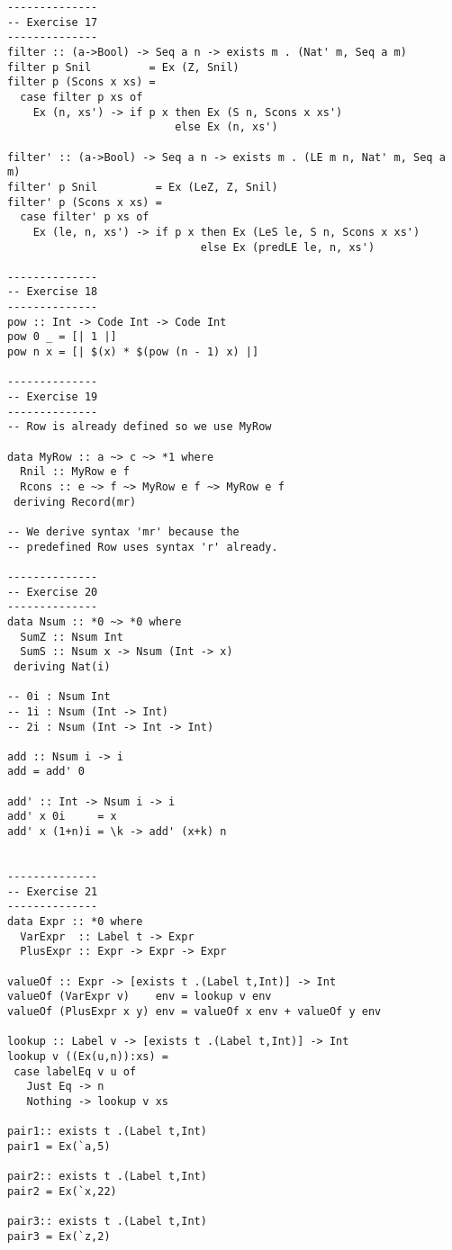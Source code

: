 \documentclass[11pt,twoside,A4]{llncs}
\begin{document}
{\small 
\begin{verbatim}
--------------
-- Exercise 17
--------------
filter :: (a->Bool) -> Seq a n -> exists m . (Nat' m, Seq a m)
filter p Snil         = Ex (Z, Snil)
filter p (Scons x xs) =
  case filter p xs of
    Ex (n, xs') -> if p x then Ex (S n, Scons x xs')
                          else Ex (n, xs')

filter' :: (a->Bool) -> Seq a n -> exists m . (LE m n, Nat' m, Seq a m)
filter' p Snil         = Ex (LeZ, Z, Snil)
filter' p (Scons x xs) =
  case filter' p xs of
    Ex (le, n, xs') -> if p x then Ex (LeS le, S n, Scons x xs')
                              else Ex (predLE le, n, xs')

--------------
-- Exercise 18
--------------
pow :: Int -> Code Int -> Code Int
pow 0 _ = [| 1 |]
pow n x = [| $(x) * $(pow (n - 1) x) |]

--------------
-- Exercise 19
--------------
-- Row is already defined so we use MyRow

data MyRow :: a ~> c ~> *1 where
  Rnil :: MyRow e f
  Rcons :: e ~> f ~> MyRow e f ~> MyRow e f
 deriving Record(mr)

-- We derive syntax 'mr' because the
-- predefined Row uses syntax 'r' already.

--------------
-- Exercise 20
--------------
data Nsum :: *0 ~> *0 where
  SumZ :: Nsum Int
  SumS :: Nsum x -> Nsum (Int -> x)
 deriving Nat(i)

-- 0i : Nsum Int
-- 1i : Nsum (Int -> Int)
-- 2i : Nsum (Int -> Int -> Int)

add :: Nsum i -> i
add = add' 0

add' :: Int -> Nsum i -> i
add' x 0i     = x
add' x (1+n)i = \k -> add' (x+k) n


--------------
-- Exercise 21
--------------
data Expr :: *0 where
  VarExpr  :: Label t -> Expr
  PlusExpr :: Expr -> Expr -> Expr

valueOf :: Expr -> [exists t .(Label t,Int)] -> Int
valueOf (VarExpr v)    env = lookup v env
valueOf (PlusExpr x y) env = valueOf x env + valueOf y env

lookup :: Label v -> [exists t .(Label t,Int)] -> Int
lookup v ((Ex(u,n)):xs) = 
 case labelEq v u of 
   Just Eq -> n
   Nothing -> lookup v xs

pair1:: exists t .(Label t,Int)
pair1 = Ex(`a,5)

pair2:: exists t .(Label t,Int)
pair2 = Ex(`x,22)

pair3:: exists t .(Label t,Int)
pair3 = Ex(`z,2)


\end{verbatim}}
\end{document}
